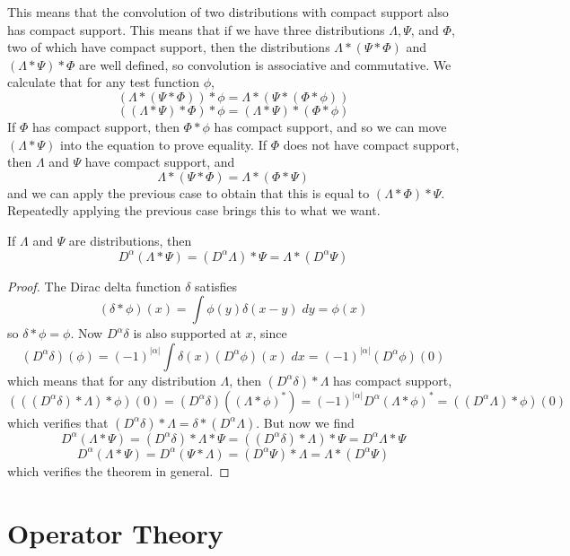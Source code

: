 This means that the convolution of two distributions with compact support also has compact support. This means that if we have three distributions $\Lambda, \Psi$, and $\Phi$, two of which have compact support, then the distributions $\Lambda * (\Psi * \Phi)$ and $(\Lambda * \Psi) * \Phi$ are well defined, so convolution is associative and commutative. We calculate that for any test function $\phi$,
%
\[ (\Lambda * (\Psi * \Phi)) * \phi = \Lambda * (\Psi * (\Phi * \phi)) \]
\[ ((\Lambda * \Psi) * \Phi) * \phi = (\Lambda * \Psi) * (\Phi * \phi) \]
%
If $\Phi$ has compact support, then $\Phi * \phi$ has compact support, and so we can move $(\Lambda * \Psi)$ into the equation to prove equality. If $\Phi$ does not have compact support, then $\Lambda$ and $\Psi$ have compact support, and
%
\[ \Lambda * (\Psi * \Phi) = \Lambda * (\Phi * \Psi) \]
%
and we can apply the previous case to obtain that this is equal to $(\Lambda * \Phi) * \Psi$. Repeatedly applying the previous case brings this to what we want.

\begin{theorem}
    If $\Lambda$ and $\Psi$ are distributions, then
    \[ D^\alpha(\Lambda * \Psi) = (D^\alpha \Lambda) * \Psi = \Lambda * (D^\alpha \Psi) \]
\end{theorem}
\begin{proof}
    The Dirac delta function $\delta$ satisfies
    \[ (\delta * \phi)(x) = \int \phi(y) \delta(x-y)\; dy = \phi(x) \]
    so $\delta * \phi = \phi$. Now $D^\alpha \delta$ is also supported at $x$, since
    \[ (D^\alpha \delta)(\phi) = (-1)^{|\alpha|} \int \delta(x) (D^\alpha \phi)(x)\; dx = (-1)^{|\alpha|} (D^\alpha \phi)(0) \]
    which means that for any distribution $\Lambda$, then $(D^\alpha \delta) * \Lambda$ has compact support,
    \[ (((D^\alpha \delta) * \Lambda) * \phi)(0) = (D^\alpha \delta)((\Lambda * \phi)^*) = (-1)^{|\alpha|} D^\alpha (\Lambda * \phi)^* = ((D^\alpha \Lambda) * \phi)(0) \]
    which verifies that $(D^\alpha \delta) * \Lambda = \delta * (D^\alpha \Lambda)$. But now we find
    \[ D^\alpha(\Lambda * \Psi) = (D^\alpha \delta) * \Lambda * \Psi = ((D^\alpha \delta) * \Lambda) * \Psi = D^\alpha \Lambda * \Psi \]
    \[ D^\alpha(\Lambda * \Psi) = D^\alpha(\Psi * \Lambda) = (D^\alpha \Psi) * \Lambda = \Lambda * (D^\alpha \Psi) \]
    which verifies the theorem in general.
\end{proof}



\part{Operator Theory}





